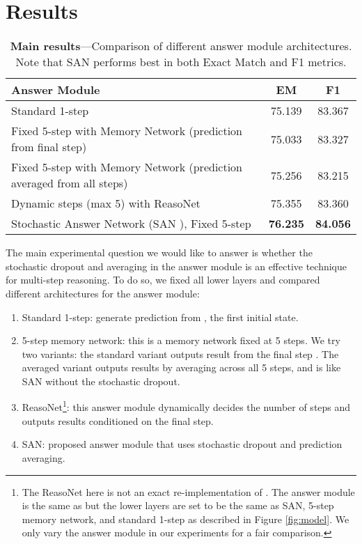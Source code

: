 \documentclass[11pt,a4paper]{article}
\newcommand\DR{SAN }
\begin{document}
\section{Results}
\begin{table*}[ht!]
\centering
\begin{tabular}{ l || c | c}
\hline
Answer Module	&EM&F1\\ \hline\hline
Standard 1-step &75.139 &83.367 \\ \hline
Fixed 5-step with Memory Network (prediction from final step) &75.033 & 83.327  \\ \hline
Fixed 5-step with Memory Network (prediction averaged from all steps) &75.256 & 83.215  \\ \hline
Dynamic steps (max 5) with ReasoNet & 75.355 &  83.360\\ \hline
Stochastic Answer Network (\DR), Fixed 5-step &\textbf{76.235}& {\textbf{84.056}} \\ \hline
\end{tabular}
\caption{\label{tab:model_comp} \textbf{Main results}---Comparison of different answer module architectures. Note that SAN performs best in both Exact Match and F1 metrics.} 
\end{table*}

The main experimental question we would like to answer is whether the stochastic dropout and averaging in the answer module is an effective technique for multi-step reasoning. 
To do so, we fixed all lower layers and compared different architectures for the answer module: 
\begin{enumerate}
\item Standard 1-step: generate prediction from , the first initial state.
\item 5-step memory network: this is a memory network fixed at 5 steps. We try two variants: the standard variant outputs result from the final step . The averaged variant outputs results by averaging across all 5 steps, and is like SAN without the stochastic dropout. 
\item ReasoNet\footnote{The ReasoNet here is not an exact re-implementation of \cite{shen2017empirical}. The answer module is the same as \cite{shen2017empirical} but the lower layers are set to be the same as SAN, 5-step memory network, and standard 1-step as described in Figure \ref{fig:model}. We only vary the answer module in our experiments for a fair comparison.}: this answer module dynamically decides the number of steps and outputs results conditioned on the final step.
\item SAN: proposed answer module that uses stochastic dropout and prediction averaging.
\end{enumerate}
\end{document}
